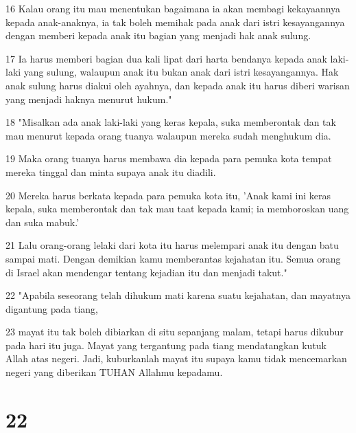 \par 16 Kalau orang itu mau menentukan bagaimana ia akan membagi kekayaannya kepada anak-anaknya, ia tak boleh memihak pada anak dari istri kesayangannya dengan memberi kepada anak itu bagian yang menjadi hak anak sulung.
\par 17 Ia harus memberi bagian dua kali lipat dari harta bendanya kepada anak laki-laki yang sulung, walaupun anak itu bukan anak dari istri kesayangannya. Hak anak sulung harus diakui oleh ayahnya, dan kepada anak itu harus diberi warisan yang menjadi haknya menurut hukum."
\par 18 "Misalkan ada anak laki-laki yang keras kepala, suka memberontak dan tak mau menurut kepada orang tuanya walaupun mereka sudah menghukum dia.
\par 19 Maka orang tuanya harus membawa dia kepada para pemuka kota tempat mereka tinggal dan minta supaya anak itu diadili.
\par 20 Mereka harus berkata kepada para pemuka kota itu, 'Anak kami ini keras kepala, suka memberontak dan tak mau taat kepada kami; ia memboroskan uang dan suka mabuk.'
\par 21 Lalu orang-orang lelaki dari kota itu harus melempari anak itu dengan batu sampai mati. Dengan demikian kamu memberantas kejahatan itu. Semua orang di Israel akan mendengar tentang kejadian itu dan menjadi takut."
\par 22 "Apabila seseorang telah dihukum mati karena suatu kejahatan, dan mayatnya digantung pada tiang,
\par 23 mayat itu tak boleh dibiarkan di situ sepanjang malam, tetapi harus dikubur pada hari itu juga. Mayat yang tergantung pada tiang mendatangkan kutuk Allah atas negeri. Jadi, kuburkanlah mayat itu supaya kamu tidak mencemarkan negeri yang diberikan TUHAN Allahmu kepadamu.

\chapter{22}

